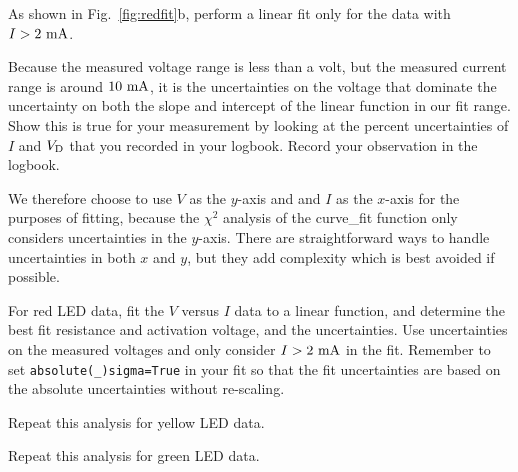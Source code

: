 As shown in Fig.~\ref{fig:redfit}b, perform a linear
fit only for the data with $I>2~\rm mA$.




\begin{measurement} 
Because the measured voltage range is
less than a volt, but the measured current range is around $10~\rm
mA$, it is the uncertainties on the voltage that dominate the
uncertainty on both the slope and intercept of the linear function in our fit range. Show this is true for your measurement by looking at the percent uncertainties of $I$ and $V_{\rm D}$ that you recorded in your logbook. Record your observation in the logbook.
\end{measurement}


We therefore choose to use $V$ as the $y$-axis and and $I$ as the
$x$-axis for the purposes of fitting, because the $\chi^2$ analysis of
the {\rm curve{\_}fit} function only considers uncertainties in the
$y$-axis.  There are straightforward ways to handle uncertainties in
both $x$ and $y$, but they add complexity which is best avoided if
possible.

\begin{plot} For red LED data, fit the $V$ versus $I$ data to a linear function, and
determine the best fit resistance and activation voltage, and the
uncertainties.  
Use uncertainties on the measured voltages
and only consider $I > 2~\rm mA$ in
the fit.  Remember to set {\tt absolute(\_)sigma=True} in your fit so
that the fit uncertainties are based on the absolute uncertainties
without re-scaling. \end{plot}

\begin{plot} 
Repeat this analysis for yellow LED data.
\end{plot}

\begin{plot} 
Repeat this analysis for green LED data.
\end{plot}

